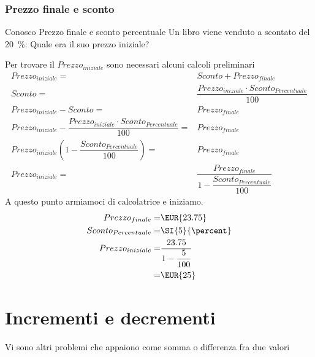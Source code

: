 \subsection{Prezzo finale e sconto}
	\begin{esempiot}{Conosco Prezzo finale e sconto percentuale}{}
Un libro viene venduto a  scontato del \SI{20}{\percent}: Quale era il suo prezzo iniziale?
\end{esempiot}
Per trovare il ${Prezzo}_{iniziale}$ sono necessari alcuni calcoli preliminari
\begin{align*}
	{Prezzo}_{iniziale}=&Sconto+{Prezzo}_{finale}\\
		Sconto=&\dfrac{{Prezzo}_{iniziale}\cdot {Sconto}_{Percentuale} }{100}\\
		{Prezzo}_{iniziale}-Sconto=&{Prezzo}_{finale}\\
	{Prezzo}_{iniziale}-\dfrac{{Prezzo}_{iniziale}\cdot {Sconto}_{Percentuale} }{100}=&{Prezzo}_{finale}\\
	{Prezzo}_{iniziale}\left(1-\dfrac{{Sconto}_{Percentuale} }{100}\right)=&{Prezzo}_{finale}\\
	{Prezzo}_{iniziale}=&\dfrac{{Prezzo}_{finale}}{1-\dfrac{{Sconto}_{Percentuale} }{100}}
\end{align*}
A questo punto armiamoci di calcolatrice e iniziamo.
\begin{align*}
	{Prezzo}_{finale}=&\mbox{\EUR{23.75}}\\
	{Sconto}_{Percentuale}=&\SI{5}{\percent}\\
{Prezzo}_{iniziale}=&\dfrac{23.75}{1-\dfrac{5}{100}}\\
=&\mbox{\EUR{25}}
\end{align*}
\chapter{Incrementi e decrementi}
Vi sono altri problemi che appaiono come somma o differenza fra due valori
